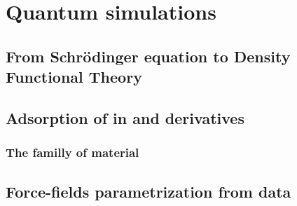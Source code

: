 \documentclass[thesis]{subfiles}
\begin{document}
\chapter{Quantum simulations}
\startcontents[chapters]
\printpartialtoc

\section{From Schrödinger equation to Density Functional Theory}


\section{Adsorption of  in  and derivatives}

\subsection{The  familly of material}

\section{Force-fields parametrization from \abinitio data}
\end{document}
